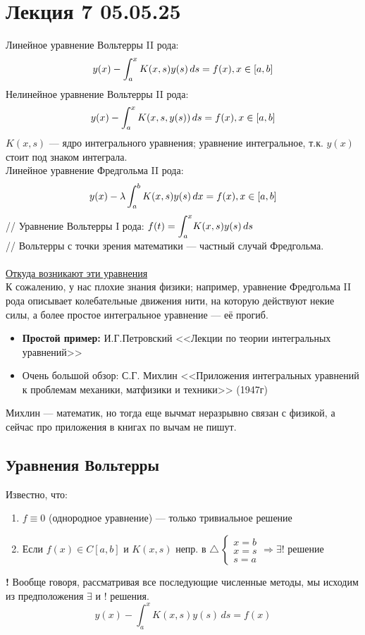 \section{Лекция 7 05.05.25}
Линейное уравнение Вольтерры II рода:
\[y(x) -  \int_{a}^{x} K(x,s)y(s) \,ds  = f(x),\space x\in[a,b] \] 
Нелинейное уравнение Вольтерры II рода:
\[y(x) -  \int_{a}^{x} K(x,s,y(s)) \,ds  = f(x),\space x\in[a,b] \] 
\(K(x,s)\) --- ядро интегрального уравнения; уравнение интегральное, т.к. \(y(x)\) стоит под знаком интеграла.\\
Линейное уравнение Фредгольма II рода: 
\[y(x) -  \lambda\int_{a}^{b} K(x,s)y(s) \,dx  = f(x),\space x\in[a,b] \] 
// Уравнение Вольтерры I рода: \( f(t) = \mathlarger{\int}_{a}^{x} K(x,s)y(s)\,ds\)\\// Вольтерры с точки зрения математики --- частный случай Фредгольма.\\\\
\underline{Откуда возникают эти уравнения}\\
К сожалению, у нас плохие знания физики; например, уравнение Фредгольма II рода описывает колебательные движения нити, на которую действуют некие силы, а более простое интегральное уравнение --- её прогиб.
\begin{itemize}
    \item \textbf{Простой пример:} И.Г.Петровский <<Лекции по теории интегральных уравнений>>
    \item Очень большой обзор: С.Г. Михлин <<Приложения интегральных уравнений к проблемам механики, матфизики и техники>> (1947г)
\end{itemize}
Михлин --- математик, но тогда еще вычмат неразрывно связан с физикой, а сейчас про приложения в книгах по вычам не пишут.
\subsection{Уравнения Вольтерры}
Известно, что:
\begin{enumerate}
    \item \( f \equiv 0\) (однородное уравнение) --- только тривиальное решение
    \item Если \(f(x) \in C[a,b]\) и \(K(x,s)\) непр. в $\triangle \, \begin{cases} 
    x=b\\
    x=s\\
    s=a
    \end{cases} \Rightarrow \exists!$ решение
\end{enumerate}
\textbf{!} Вообще говоря, рассматривая все последующие численные методы, мы исходим из предположения $\exists$ и $!$ решения.
\[y(x) -  \int_{a}^{x} K(x,s)y(s) \,ds  = f(x) \]
